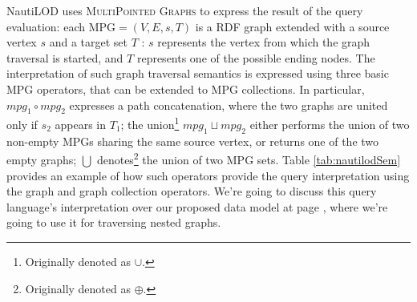 
NautiLOD uses \textsc{MultiPointed Graphs} to express the result of the query evaluation: each MPG$=(V,E,s,T)$ is a RDF graph extended with a source vertex $s$ and a target set $T$ : $s$ represents the vertex from which the graph traversal is started, and $T$ represents one of the possible ending nodes. The interpretation of such graph traversal semantics is expressed using three basic MPG operators, that can be extended to MPG collections. In particular,  $mpg_1 \circ mpg_2$ expresses a path concatenation, where the two graphs are united only if $s_2$ appears in $T_1$; the union\footnote{Originally denoted as $\cup$.} $mpg_1 \sqcup mpg_2$ either performs the union of two non-empty MPGs sharing the same source vertex, or returns one of the two empty graphs; $\bigcup$ denotes\footnote{Originally denoted as $\oplus$.} the union of two MPG sets. Table \ref{tab:nautilodSem} provides an example of how such operators provide the query interpretation using the graph and graph collection operators.  We're going to discuss this query language's interpretation over our proposed data model at page \pageref{ph:NTLImpl}, where we're going to use it for traversing nested graphs.
